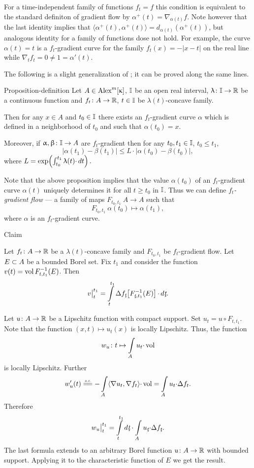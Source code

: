 \documentclass[oneside,a4paper]{article}
\begin{document}
For a time-independent family of functions $f_t=f$ this condition is equivalent to the standard definiton of gradient flow by $\alpha^+(t)=\nabla_{\alpha(t)} f$.
Note however that the last identity implies that $\langle\alpha^+(t),\alpha^+(t)\rangle=d_{\alpha(t)}(\alpha^+(t))$, but analogous identity for a family of functions dose not hold.
For example, the curve $\alpha(t)=t$ is a $f_t$-gradient curve for the family $f_t(x)=-|x-t|$ on the real line while $\nabla_t f_t=0\ne 1=\alpha'(t)$.

The following is a slight generalization of \cite[2.1.2$\&$2.2(2)]{petrunin:survey}; it can be proved along the same lines.

\begin{thm}{Proposition-definition}\label{prop-def}
Let $A\in\CBB m\kappa$,
$\mathbb{I}$ be an open real interval, 
$\uplambda\colon\mathbb{I}\to\mathbb{R}$ be a continuous function and 
$f_t\colon A\to \mathbb{R}$, $t\in \mathbb{I}$ be $\lambda(t)$-concave family.

Then for any $x\in A$ and $t_0\in \mathbb{I}$ there exists an $f_t$-gradient curve $\alpha$ which is defined in a neighborhood of $t_0$ and such that $\alpha(t_0)=x$.

Moreover, if $\upalpha,\upbeta\colon\mathbb{I}\to A$ are $f_t$-gradient then for any $t_0,t_1\in\mathbb{I}$, $t_0\le t_1$,
$$|\alpha(t_1)-\beta(t_1)|\le L{\cdot}|\alpha(t_0)-\beta(t_0)|,$$
where $L=\exp\!\left(\int_{t_0}^{t_1}\uplambda(t){\cdot}\,d t\right).$
\end{thm}

Note that the above proposition implies that the value $\alpha(t_0)$ of an $f_t$-gradient curve $\alpha(t)$ uniquely determines it for all $t\ge t_0$ in $\mathbb{I}$. 
Thus we can define \emph{$f_t$-gradient flow} --- a family of maps $F_{{t_0},{t_1}}\: A\to A$ such that
$$F_{{t_0},{t_1}}\:\alpha(t_0)\mapsto\alpha(t_1),$$
where $\alpha$ is an $f_t$-gradient curve.

\begin{thm}{Claim}\label{vol-lap}
{\sloppy Let $f_t\colon A\to\mathbb{R}$ be a $\lambda(t)$-concave family and $F_{{t_0},{t_1}}$ be $f_t$-gradient flow.
Let $E\subset A$ be a bounded Borel set. 
Fix $t_1$ and consider the function 
\hbox{$v(t)=\mathop{\rm vol}\nolimits F^{-1}_{{t},{t_1}}(E)$}.
Then 
$$\bigl.v\bigr|_t^{t_1}
=
\int\limits_t^{t_1}\Lap f_\under{t}\l[F^{-1}_{\under{t},{t_1}}(E)\r]{\cdot}\,d\under{t}.$$

}
\end{thm}

Let $u\colon A\to\mathbb{R}$ be a Lipschitz function with compact support.
Set $u_t=u\circ F_{{t},{t_1}}$.
Note that the function $(x,t)\mapsto u_t(x)$ is locally Lipschitz.
Thus, the function 
$$w_u\colon t\mapsto \int\limits_A u_t{\cdot}\mathop{\rm vol}\nolimits$$ 
is locally Lipschitz.
Further
$$w_u'(t)\ae
-\int\limits_A \<\nabla u_t,\nabla f_t\>{\cdot}\vol
=
\int\limits_A u_t{\cdot}\Lap f_t.$$
Therefore 
$$\bigl.w_u\bigr|_t^{t_1}
=
\int\limits_t^{t_1}d\under{t}\cdot\int\limits_A u_{\under{t}}{\cdot}\Lap f_{\under{t}}.$$
The last formula extends to an arbitrary Borel function $u\colon A\to\mathbb{R}$ with bounded support.
Applying it to the characteristic function of $E$ we get the result.
\qeds
\end{document}

